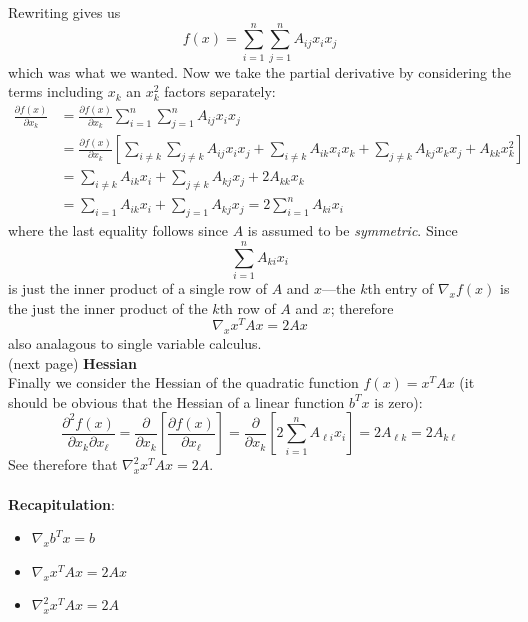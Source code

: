 \documentclass{report}
\begin{document}
Rewriting gives us
\begin{equation*}
f(x)=\sum^n_{i=1}\sum^n_{j=1}A_{ij}x_ix_j
\end{equation*}
which was what we wanted. Now we take the partial derivative by considering the terms including $x_k$ an
$x_k^2$ factors separately:
\begin{align*}
\frac{\partial f(x)}{\partial x_k}&=\frac{\partial f(x)}{\partial x_k}\sum^n_{i=1}\sum^n_{j=1}A_{ij}x_ix_j\\
&=\frac{\partial f(x)}{\partial x_k}\left[\sum_{i\neq k}
\sum_{j\neq k}A_{ij}x_ix_j+\sum_{i\neq k}A_{ik}x_ix_k
+\sum_{j\neq k}A_{kj}x_kx_j+A_{kk}x_k^2\right]\\
&=\sum_{i\neq k}A_{ik}x_i+\sum_{j\neq k}A_{kj}x_j+2A_{kk}x_k\\
&=\sum_{i=1}A_{ik}x_i+\sum_{j=1}A_{kj}x_j=2\sum^n_{i=1}A_{ki}x_i
\end{align*}
where the last equality follows since $A$ is assumed to be \textit{symmetric}. Since 
\begin{equation*}
\sum^n_{i=1}A_{ki}x_i
\end{equation*}
is just the inner product of a single row of $A$ and $x$---the $k$th entry of $\nabla_xf(x)$ is the just the 
inner product of the $k$th row of $A$ and $x$; therefore 
\begin{equation*}
\nabla_xx^TAx=2Ax
\end{equation*}
also analagous to single variable calculus.\\
(next page)
\newpage
\noindent\textbf{Hessian}\\
Finally we consider the Hessian of the quadratic function $f(x)=x^TAx$ (it should be obvious
that the Hessian of a linear function $b^Tx$ is zero):
\begin{equation*}
\frac{\partial^2f(x)}{\partial x_k\partial x_\ell}=
\frac{\partial}{\partial x_k}\left[\frac{\partial f(x)}{\partial x_\ell}\right]
=\frac{\partial}{\partial x_k}\left[2\sum^n_{i=1}A_{\ell i}x_i\right]=2A_{\ell k}=2A_{k\ell}
\end{equation*}
See therefore that $\nabla^2_xx^TAx=2A$.\\
\vspace{1mm}\\
\textbf{Recapitulation}:
\begin{itemize}
\item$\nabla_xb^Tx=b$
\item$\nabla_xx^TAx=2Ax$
\item$\nabla^2_xx^TAx=2A$
\end{itemize}
\newpage
\end{document}
